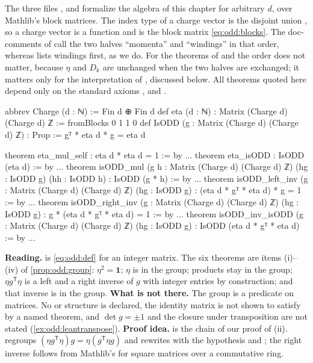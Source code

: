 The three files ,  and
 formalize the algebra of this chapter for arbitrary $d$, over Mathlib's
block matrices. The index type of a charge vector is the disjoint union
, so a charge vector is a function  and
 is the block matrix \eqref{eq:odd:blocks}. The doc-comments of
 call the two halves ``momenta'' and ``windings'' in that order, whereas
 lists windings first, as we do. For the theorems of
 and  the order does not matter, because $\eta$ and
$D_k$ are unchanged when the two halves are exchanged; it matters only for the
interpretation of , discussed below. All theorems quoted here depend only
on the standard axioms ,  and .

\begin{leanbox}
\begin{leancode}
abbrev Charge (d : ℕ) := Fin d ⊕ Fin d
def eta (d : ℕ) : Matrix (Charge d) (Charge d) ℤ := fromBlocks 0 1 1 0
def IsODD (g : Matrix (Charge d) (Charge d) ℤ) : Prop :=
  gᵀ * eta d * g = eta d

theorem eta_mul_self : eta d * eta d = 1 := by ...
theorem eta_isODD : IsODD (eta d) := by ...
theorem isODD_mul (g h : Matrix (Charge d) (Charge d) ℤ)
    (hg : IsODD g) (hh : IsODD h) : IsODD (g * h) := by ...
theorem isODD_left_inv (g : Matrix (Charge d) (Charge d) ℤ) (hg : IsODD g) :
    (eta d * gᵀ * eta d) * g = 1 := by ...
theorem isODD_right_inv (g : Matrix (Charge d) (Charge d) ℤ) (hg : IsODD g) :
    g * (eta d * gᵀ * eta d) = 1 := by ...
theorem isODD_inv_isODD (g : Matrix (Charge d) (Charge d) ℤ) (hg : IsODD g) :
    IsODD (eta d * gᵀ * eta d) := by ...
\end{leancode}
\textbf{Reading.}  is \eqref{eq:odd:def} for an integer matrix. The six
theorems are items (i)--(iv) of \cref{prop:odd:group}: $\eta^2=\mathbf 1$; $\eta$ is in the
group; products stay in the group; $\eta g^{\mathsf T}\eta$ is a left and a right inverse of
$g$ with integer entries by construction; and that inverse is in the group.
\textbf{What is not there.} The group is a predicate on matrices. No  or
 structure is declared, the identity matrix is not shown to satisfy
 by a named theorem, and $\det g=\pm1$ and the closure under transposition are
not stated (\cref{ex:odd:leantranspose}).
\textbf{Proof idea.}  is the  chain of our proof of (ii).
 regroups $(\eta g^{\mathsf T}\eta)g=\eta(g^{\mathsf T}\eta g)$ and
rewrites with the hypothesis and ; the right inverse follows from
Mathlib's  for square matrices over a commutative ring. \TA
\end{leanbox}

